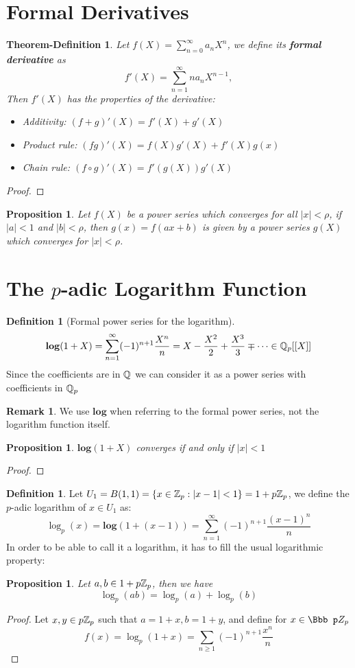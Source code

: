 \documentclass[a4paper]{article}
\theoremstyle{plain}
\newtheorem{prop}[thm]{Proposition}
\newtheorem{thm-defi}[thm]{Theorem-Definition}
\theoremstyle{definition}
\newtheorem{defi}[thm]{Definition}
\newtheorem{rem}[thm]{Remark}
\begin{document}
\section{Formal Derivatives}
\begin{thm-defi}
  Let $f(X) = \sum_{n=0}^{\infty} a_{n}X^{n} $, we define its \textbf{formal derivative} as
  $$f'(X) = \sum_{n=1}^{\infty} na_{n}X^{n-1}, $$
  Then $f'(X)$ has the properties of the derivative:
  \begin{itemize}
    \item Additivity: $(f+g)'(X) = f'(X) + g'(X)$
    \item Product rule: $(fg)'(X) = f(X)g'(X) + f'(X)g(x)$
    \item Chain rule: $(f \circ g)'(X) = f'(g(X))g'(X)$
  \end{itemize}
\end{thm-defi}
\begin{proof}

\end{proof}
\begin{prop}
Let $f(X)$ be a power series which converges for all $|x| < \rho$, if $|a| < 1$ and $|b| < \rho$, then $g(x) = f(ax+b)$ is given by a power series $g(X)$ which converges for $|x| < \rho$.
\end{prop}
\section{The $p$-adic Logarithm Function}
\begin{defi}[Formal power series for the logarithm]   $$\mathbf{log}(1+X) = \sum_{n=1}^{\infty} (-1)^{n+1}\frac {X^{n}}{n} = X - \frac{X^{2}}{2} + \frac{X^{3}}{3} \mp \cdots \in \Bbb Q_{p}[[X]]$$
  Since the coefficients are in $\Bbb Q$ we can consider it as a power series with coefficients in $\Bbb Q_{p}$
\end{defi}
\begin{rem}
We use $\mathbf{log}$ when referring to the formal power series, not the logarithm function itself.
\end{rem}
\begin{prop} $\mathbf{log}(1+X)$ converges if and only if $|x| < 1$
\end{prop}
\begin{proof}
\end{proof}
\begin{defi}Let $U_{1} = B(1,1) = \{x \in \Bbb Z_{p} : |x-1| < 1\} = 1+p\Bbb Z_{p}$, we define the $p$-adic logarithm of $x \in U_{1}$ as:
  $$\log_{p}(x) = \mathbf{log}(1+(x-1)) = \sum_{n=1}^{\infty} (-1)^{n+1}\frac {(x-1)^{n}}{n}$$
  In order to be able to call it a logarithm, it has to fill the usual logarithmic property:
\end{defi}
\begin{prop}
  Let $a, b \in 1+p\Bbb Z_{p}$, then we have
  $$\log_{p}(ab) = \log_{p}(a) + \log_{p}(b)$$
\end{prop}
\begin{proof}
  Let $x, y \in p\Bbb Z_{p}$ such that $a= 1+x, b =1+y$, and define for $x \in \Bbb pZ_{p}$
  $$f(x) = \log_{p}(1+x) = \sum_{n \geq 1}(-1)^{n+1}\frac {x^{n}}{n}$$
\end{proof}
\end{document}
